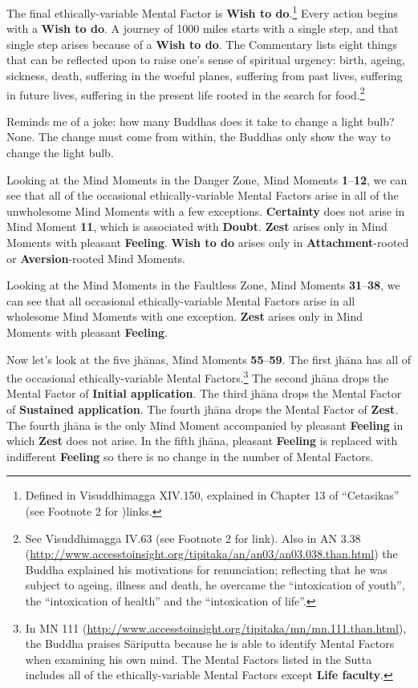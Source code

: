 The final ethically-variable Mental Factor is \textbf{Wish to do}.\footnote{Defined in Visuddhimagga XIV.150, explained in Chapter 13 of “Cetasikas” (see Footnote 2 for )links.} Every action begins with a \textbf{Wish to do}. A journey of 1000 miles starts with a single step, and that single step arises because of a \textbf{Wish to do}. The Commentary lists eight things that can be reflected upon to raise one’s sense of spiritual urgency: birth, ageing, sickness, death, suffering in the woeful planes, suffering from past lives, suffering in future lives, suffering in the present life rooted in the search for food.\footnote{See Visuddhimagga IV.63 (see Footnote 2 for link). Also in AN 3.38 (\url{http://www.accesstoinsight.org/tipitaka/an/an03/an03.038.than.html}) the Buddha explained his motivations for renunciation; reflecting that he was subject to ageing, illness and death, he overcame the “intoxication of youth”, the “intoxication of health” and the “intoxication of life”.}

Reminds me of a joke: how many Buddhas does it take to change a light bulb? None. The change must come from within, the Buddhas only show the way to change the light bulb.

Looking at the Mind Moments in the Danger Zone, Mind Moments \textbf{1}--\textbf{12}, we can see that all of the occasional ethically-variable Mental Factors arise in all of the unwholesome Mind Moments with a few exceptions. \textbf{Certainty} does not arise in Mind Moment \textbf{11}, which is associated with \textbf{Doubt}. \textbf{Zest} arises only in Mind Moments with pleasant \textbf{Feeling}. \textbf{Wish to do} arises only in \textbf{Attachment}-rooted or \textbf{Aversion}-rooted Mind Moments.

Looking at the Mind Moments in the Faultless Zone, Mind Moments \textbf{31}--\textbf{38}, we can see that all occasional ethically-variable Mental Factors arise in all wholesome Mind Moments with one exception. \textbf{Zest} arises only in Mind Moments with pleasant \textbf{Feeling}.

Now let’s look at the five jhānas, Mind Moments \textbf{55}--\textbf{59}. The first jhāna has all of the occasional ethically-variable Mental Factors.\footnote{In MN 111 (\url{http://www.accesstoinsight.org/tipitaka/mn/mn.111.than.html}), the Buddha praises Sāriputta because he is able to identify Mental Factors when examining his own mind. The Mental Factors listed in the Sutta includes all of the ethically-variable Mental Factors except \textbf{Life faculty}.} The second jhāna drops the Mental Factor of \textbf{Initial application}. The third jhāna drops the Mental Factor of \textbf{Sustained application}. The fourth jhāna drops the Mental Factor of \textbf{Zest}. The fourth jhāna is the only Mind Moment accompanied by pleasant \textbf{Feeling} in which \textbf{Zest} does not arise. In the fifth jhāna, pleasant \textbf{Feeling} is replaced with indifferent \textbf{Feeling} so there is no change in the number of Mental Factors.


